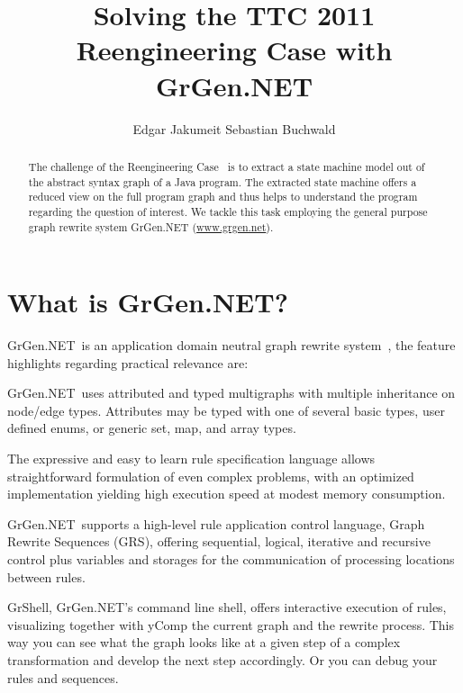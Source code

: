 \documentclass[copyright]{eptcs}
\title{Solving the TTC 2011 Reengineering Case with GrGen.NET}
\author{Edgar Jakumeit \quad \quad Sebastian Buchwald
\institute{Karlsruhe Institute of Technology (KIT)}
\email{\phantom{~~~~~~~~~~~~~~~~~~} \quad \quad buchwald@kit.edu}
}
\newcommand{\name}[1]{{\sc #1}}
\newcommand{\grgennet}{\name{GrGen.NET}}
\newcommand{\grshell}{\name{GrShell}}
\begin{document}
\maketitle

\begin{abstract}
The challenge of the Reengineering Case~\cite{programunderstandingcase} is to extract a state machine model out of the abstract syntax graph of a Java program.
The extracted state machine offers a reduced view on the full program graph and thus helps to understand the program regarding the question of interest.
We tackle this task employing the general purpose graph rewrite system GrGen.NET (\url{www.grgen.net}).
\end{abstract}

\section{What is GrGen.NET?}

\grgennet\ is an application domain neutral graph rewrite system~\cite{GrGenUserManual}, the feature highlights regarding practical relevance are:
\begin{description}\itemsep -2pt
\item[Fully Featured Meta Model:] \grgennet\ uses attributed and typed multigraphs with multiple inheritance on node/edge types. Attributes may be typed with one of several basic types, user defined enums, or generic set, map, and array types.
\item[Expressive Rules, Fast Execution:] The expressive and easy to learn rule specification language allows straightforward formulation of even complex problems, with an optimized implementation yielding high execution speed at modest memory consumption.
\item[Programmed Rule Application:] \grgennet\ supports a high-level rule application control language, Graph Rewrite Sequences (GRS), offering sequential, logical, iterative and recursive control plus variables and storages for the communication of processing locations between rules.
\item[Graphical Debugging:] \grshell, \grgennet's command line shell, offers interactive execution of rules, visualizing together with yComp the current graph and the rewrite process. This way you can see what the graph looks like at a given step of a complex transformation and develop the next step accordingly. Or you can debug your rules and sequences.
\end{description}
\end{document}
